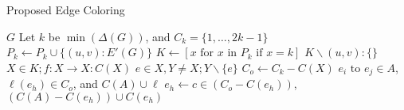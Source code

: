 \documentclass[11pt, oneside]{article}
\begin{document}
\begin{algorithm}[H]
\begin{algorithmic}[1]
\small
\caption{Proposed Edge Coloring}
\Procedure{}{}
\Ensure  $G$
\State Let $k$ be $\min{(\Delta(G))}$, and $C_{k} = \{1,\dots, 2k-1\}$
\State $P_{k} \leftarrow P_{k} \cup \{(u,v):E'(G)\}$
\EndIf
\EndFor
\State $K \leftarrow [x \text{ for } x \text{ in } P_{k} \text{ if } x = k]$
\State $K \backslash (u,v):\{\}$
\State $X\in K; f: X \rightarrow X:C(X)$
\State $e \in X, Y\not = X; Y\backslash \{e\}$
\State $C_o \leftarrow C_{k} - C(X)$
\State $e_{i} \text{ to } e_{j} \in A$, $\ell{(e_{h})} \in C_o$, and $C(A) \cup \ell$
\State $e_{h} \leftarrow c\in (C_{o} - C(e_{h}))$, 
\State $(C(A)-C(e_{h})) \cup C(e_{h})$
\EndIf
\EndIf
\EndFor
\EndWhile
\EndProcedure
\end{algorithmic}
\end{algorithm}
\end{document}
